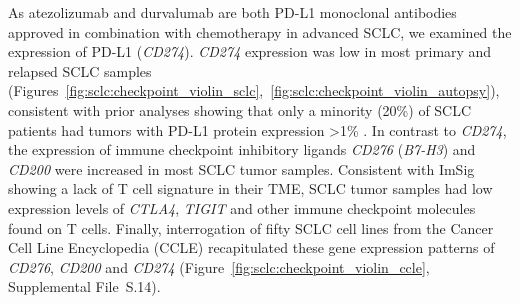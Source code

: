 As atezolizumab and durvalumab are both PD-L1 monoclonal antibodies approved in combination with chemotherapy in advanced SCLC, we examined the expression of PD-L1 (\textit{CD274}). \textit{CD274} expression was low in most primary and relapsed SCLC samples (Figures~\ref{fig:sclc:checkpoint_violin_sclc},~\ref{fig:sclc:checkpoint_violin_autopsy}), consistent with prior analyses showing that only a minority (\textapprox{}20\%) of SCLC patients had tumors with PD-L1 protein expression \textgreater{}1\% \cite{iams2020}. In contrast to \textit{CD274}, the expression of immune checkpoint inhibitory ligands \textit{CD276} (\textit{B7-H3}) and \textit{CD200} were increased in most SCLC tumor samples. Consistent with ImSig showing a lack of T cell signature in their TME, SCLC tumor samples had low expression levels of \textit{CTLA4}, \textit{TIGIT} and other immune checkpoint molecules found on T cells. Finally, interrogation of fifty SCLC cell lines from the Cancer Cell Line Encyclopedia (CCLE) recapitulated these gene expression patterns of \textit{CD276}, \textit{CD200} and \textit{CD274} (Figure~\ref{fig:sclc:checkpoint_violin_ccle}, Supplemental File~S\thechapter{}.14).


